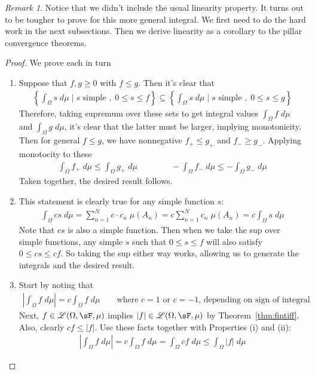 \documentclass[12pt]{article}
\theoremstyle{plain}
\theoremstyle{definition}
\theoremstyle{remark}
\newtheorem*{rmk}{Remark}
\newcommand{\sumnN}{\sum^N_{n=1}}
\begin{document}
\begin{rmk}
Notice that we didn't include the usual linearity property. It turns
out to be tougher to prove for this more general integral.
We first need to do the hard work in the next subsections.
Then we derive linearity as a corollary to the pillar convergence
theorems.
\end{rmk}

\begin{proof}
We prove each in turn
\begin{enumerate}[label=(\roman*)]
  \item
    Suppose that $f,g\geq 0$ with $f\leq g$. Then it's clear that
    \begin{align*}
      \left\{\int_\Omega s \;d\mu\;|\; \text{$s$ simple }, \; 0 \leq s\leq f\right\}
      \subseteq
      \left\{\int_\Omega s \;d\mu\;|\; \text{$s$ simple }, \; 0 \leq s\leq g\right\}
    \end{align*}
    Therefore, taking supremum over these sets to get integral
    values $\int_\Omega f\;d\mu$ and $\int_\Omega g\;d\mu$,
    it's clear that the latter must be larger, implying monotonicity.
    Then for general $f\leq g$, we have nonnegative $f_+ \leq g_+$ and
    $f_- \geq g_-$. Applying monotocity to these
    \begin{align*}
      \int_\Omega f_+ \; d\mu \leq
      \int_\Omega g_+ \; d\mu
      \qquad\qquad
      -\int_\Omega f_- \; d\mu \leq
      -\int_\Omega g_- \; d\mu
    \end{align*}
    Taken together, the desired result follows.
  \item
    This statement is clearly true for any simple function $s$:
    \begin{align*}
      \int_\Omega cs \; d\mu
      = \sumnN c\cdot c_n \; \mu(A_n)
      = c\sumnN c_n \; \mu(A_n)
      = c \int_\Omega s \; d\mu
    \end{align*}
    Note that $cs$ is also a simple function.
    Then when we take the sup over simple functions, any simple $s$ such
    that $0\leq s \leq f$ will also satisfy $0\leq cs\leq cf$.
    So taking the sup either way works, allowing us to generate the
    integrals and the desired result.

  \item
    Start by noting that
    \begin{align*}
      \left\lvert \int_\Omega f \; d\mu\right\rvert
      = c \int_\Omega f \; d\mu\qquad
        \text{where $c=1$ or $c=-1$, depending on sign of integral}
    \end{align*}
    Next, $f\in\mathscr{L}(\Omega,\sF,\mu)$ implies
    $|f|\in\mathscr{L}(\Omega,\sF,\mu)$ by Theorem~\ref{thm:fintiff}.
    Also, clearly $cf\leq |f|$. Use these facts together with Properties
    (i) and (ii):
    \begin{align*}
      \left\lvert \int_\Omega f \; d\mu\right\rvert
      = c \int_\Omega f \; d\mu
      = \int_\Omega c f \; d\mu \leq
        \int_\Omega |f| \; d\mu
    \end{align*}


\end{enumerate}
\end{proof}
\end{document}
